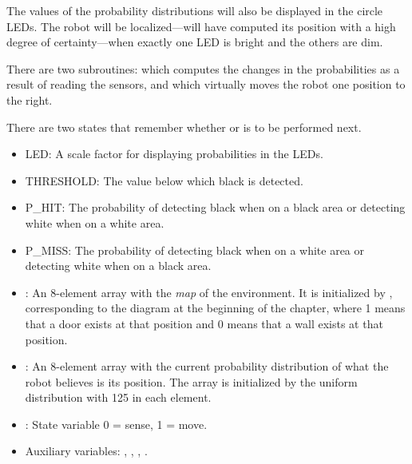 The values of the probability distributions will also be displayed in
the circle LEDs. The robot will be localized---will have computed its
position with a high degree of certainty---when exactly one LED is
bright and the others are dim.


There are two subroutines:  which computes the changes in the
probabilities as a result of reading the sensors, and  which
virtually moves the robot one position to the right.


There are two states that remember whether  or  is to
be performed next.

\begin{itemize}
\item LED: A scale factor for displaying probabilities in the LEDs.

\item THRESHOLD: The value below which black is detected.

\item P\_HIT: The probability of detecting black when on a black area or
detecting white when on a white area.
              
\item P\_MISS: The probability of detecting black when on a white area
or detecting white when on a black area.

\end{itemize}



\begin{itemize}

\item {}: An 8-element array with the \emph{map} of the
environment. It is initialized by \p{[1, 1, 0, 0, 1, 1, 1, 0]},
corresponding to the diagram at the beginning of the chapter, where 1
means that a door exists at that position and 0 means that a wall exists
at that position.

\item {}: An 8-element array with the current probability
distribution of what the robot believes is its position. The array is
initialized by the uniform distribution with 125 in each element.

\item {}: State variable 0 = sense, 1 = move.

\item Auxiliary variables: , , , .

\end{itemize}


